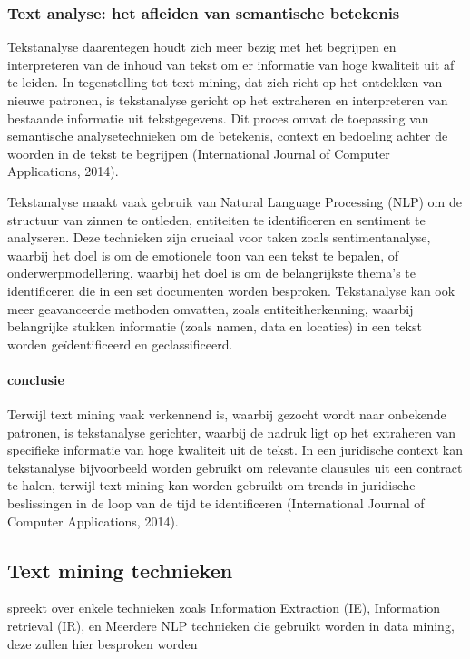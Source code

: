 \subsubsection{Text analyse: het afleiden van semantische betekenis}
Tekstanalyse daarentegen houdt zich meer bezig met het begrijpen en interpreteren van de inhoud van tekst om er informatie van hoge kwaliteit uit af te leiden. In tegenstelling tot text mining, dat zich richt op het ontdekken van nieuwe patronen, is tekstanalyse gericht op het extraheren en interpreteren van bestaande informatie uit tekstgegevens. Dit proces omvat de toepassing van semantische analysetechnieken om de betekenis, context en bedoeling achter de woorden in de tekst te begrijpen (International Journal of Computer Applications, 2014).

Tekstanalyse maakt vaak gebruik van Natural Language Processing (NLP) om de structuur van zinnen te ontleden, entiteiten te identificeren en sentiment te analyseren. Deze technieken zijn cruciaal voor taken zoals sentimentanalyse, waarbij het doel is om de emotionele toon van een tekst te bepalen, of onderwerpmodellering, waarbij het doel is om de belangrijkste thema's te identificeren die in een set documenten worden besproken. Tekstanalyse kan ook meer geavanceerde methoden omvatten, zoals entiteitherkenning, waarbij belangrijke stukken informatie (zoals namen, data en locaties) in een tekst worden geïdentificeerd en geclassificeerd.

\paragraph{conclusie}
Terwijl text mining vaak verkennend is, waarbij gezocht wordt naar onbekende patronen, is tekstanalyse gerichter, waarbij de nadruk ligt op het extraheren van specifieke informatie van hoge kwaliteit uit de tekst. In een juridische context kan tekstanalyse bijvoorbeeld worden gebruikt om relevante clausules uit een contract te halen, terwijl text mining kan worden gebruikt om trends in juridische beslissingen in de loop van de tijd te identificeren (International Journal of Computer Applications, 2014).

\subsection{Text mining technieken}
\autocite{Talib2016TextMining} spreekt over enkele technieken zoals Information Extraction (IE), Information retrieval (IR), en Meerdere NLP technieken die gebruikt worden in data mining, deze zullen hier besproken worden


